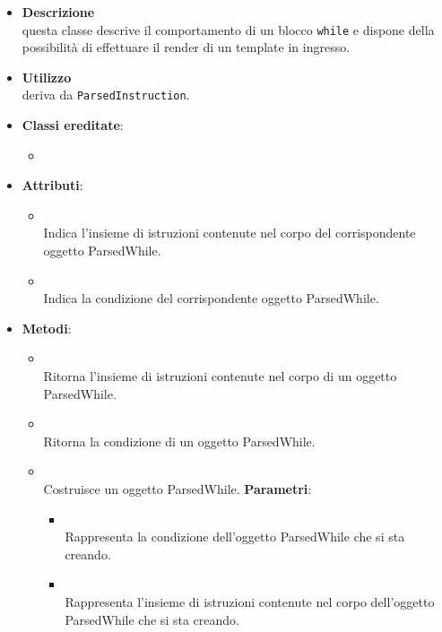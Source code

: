 \begin{itemize}
\item \textbf{Descrizione}\\
questa classe descrive il comportamento di un blocco \texttt{while} e dispone della possibilità di effettuare il render di un template in ingresso.
\item \textbf{Utilizzo}\\
deriva da \texttt{ParsedInstruction}.
\item \textbf{Classi ereditate}:
\begin{itemize}
\item \hyperref[\nogloxy{swedesigner::server::project::ParsedInstruction}]{}
\end{itemize}
\item \textbf{Attributi}:
\begin{itemize}
\item {}
\\ Indica l'insieme di istruzioni contenute nel corpo del corrispondente oggetto ParsedWhile.
\item {}
\\ Indica la condizione del corrispondente oggetto ParsedWhile.
\end{itemize}
\item \textbf{Metodi}:
\begin{itemize}
\item {}
\\ Ritorna l'insieme di istruzioni contenute nel corpo di un oggetto ParsedWhile.
\item {}
\\ Ritorna la condizione di un oggetto ParsedWhile.
\item {}
\\ Costruisce un oggetto ParsedWhile.
\textbf{Parametri}:
\begin{itemize}
\item {}
\\ Rappresenta la condizione dell'oggetto ParsedWhile che si sta creando.
\item {}
\\ Rappresenta l'insieme di istruzioni contenute nel corpo dell'oggetto ParsedWhile che si sta creando.

\end{itemize}
\end{itemize}
\end{itemize}
